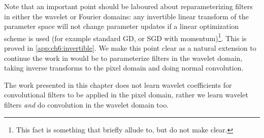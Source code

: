 Note that an important point should be laboured about reparameterizing filters
in either the wavelet or Fourier domains: any invertible linear
transform of the parameter space will not change parameter updates if a linear
optimization scheme is used (for example standard GD, or SGD with momentum)\footnote{This fact 
is something that \citeauthor{rippel_spectral_2015} briefly allude to, but do not make clear.}.
This is proved in \autoref{app:ch6:invertible}.  
We make this point clear as a natural extension to continue the work
in \cite{rippel_spectral_2015} would be to parameterize filters in the wavelet domain,
taking inverse transforms to the pixel domain and doing normal convolution. 

The work presented in this chapter does not learn wavelet coefficients 
for convolutional filters to be applied in the pixel domain, rather we learn wavelet filters 
\emph{and} do convolution in the wavelet domain too.

